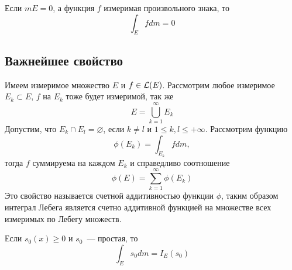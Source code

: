 \documentclass[main]{subfiles}
\begin{document}
\begin{property}
    Если $mE = 0$, а функция $f$ измеримая произвольного знака, то
    \[\int_E f dm = 0\]
\end{property}

\subsection{Важнейшее свойство}

\begin{theorem}
    Имеем измеримое множество $E$ и $f \in \mathcal{L}(E)$.
    Рассмотрим любое измеримое $E_k \subset E$, $f$ на $E_k$ тоже будет измеримой, так же
    \[E = \bigcup_{k=1}^{\infty} E_k\]
    Допустим, что $E_k \cap E_l = \varnothing$, если $k \neq l$ и $1 \le k, l \le +\infty$.
    Рассмотрим функцию
    \[\phi(E_k) = \int_{E_k} fdm, \]
    тогда $f$ суммируема на каждом $E_k$ и справедливо соотношение
    \[\phi(E) = \sum_{k=1}^{\infty}\phi(E_k) \tag{10}\]
    Это свойство называется счетной аддитивностью функции $\phi$, таким образом интеграл Лебега является счетно аддитивной функцией на множестве всех измеримых по Лебегу множеств.
\end{theorem}
\begin{remark}
    Если $s_0(x) \ge 0$ и $s_0$~--- простая, то
    \[\int_E s_0 dm = I_E(s_0)\]
\end{remark}
\end{document}
